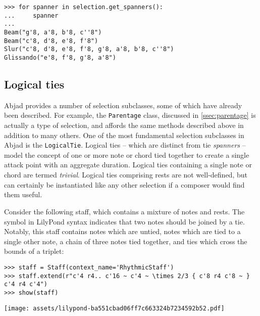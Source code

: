 \begin{abjadbookoutput}
\begin{singlespacing}
\vspace{-0.5\baselineskip}
\begin{verbatim}
>>> for spanner in selection.get_spanners():
...     spanner
...
Beam("g'8, a'8, b'8, c''8")
Beam("c'8, d'8, e'8, f'8")
Slur("c'8, d'8, e'8, f'8, g'8, a'8, b'8, c''8")
Glissando("e'8, f'8, g'8, a'8")
\end{verbatim}
\end{singlespacing}
\end{abjadbookoutput}

\subsection{Logical ties}
\label{ssec:logical-ties}

Abjad provides a number of selection subclasses, some of which have already
been described. For example, the \texttt{Parentage} class, discussed in
\autoref{ssec:parentage} is actually a type of selection, and affords the same
methods described above in addition to many others. One of the most fundamental
selection subclasses in Abjad is the \texttt{LogicalTie}. Logical ties -- which
are distinct from tie \emph{spanners} -- model the concept of one or more note
or chord tied together to create a single attack point with an aggregate
duration. Logical ties containing a single note or chord are termed
\emph{trivial}. Logical ties comprising rests are not well-defined, but can
certainly be instantiated like any other selection if a composer would find
them useful.

Consider the following staff, which contains a mixture of notes and rests. The
\texttt{~} symbol in LilyPond syntax indicates that two notes should be joined
by a tie. Notably, this staff contains notes which are untied, notes which are
tied to a single other note, a chain of three notes tied together, and ties
which cross the bounds of a triplet:

\begin{comment}
<abjad>
staff = Staff(context_name='RhythmicStaff')
staff.extend(r"c'4 r4.. c'16 ~ c'4 ~ \times 2/3 { c'8 r4 c'8 ~ } c'4 r4 c'4")
show(staff)
</abjad>
\end{comment}

\begin{abjadbookoutput}
\begin{singlespacing}
\vspace{-0.5\baselineskip}
\begin{verbatim}
>>> staff = Staff(context_name='RhythmicStaff')
>>> staff.extend(r"c'4 r4.. c'16 ~ c'4 ~ \times 2/3 { c'8 r4 c'8 ~ } c'4 r4 c'4")
>>> show(staff)
\end{verbatim}
\noindent\texttt{[image: assets/lilypond-ba551cbad06ff7c663324b7234592b52.pdf]}
\end{singlespacing}
\end{abjadbookoutput}

